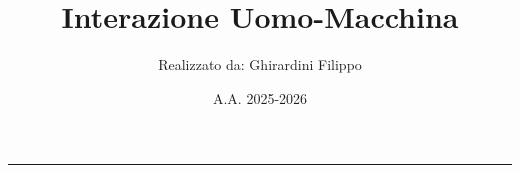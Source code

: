 \documentclass[a4paper,10pt]{article}
\title{\textbf{Interazione Uomo-Macchina}}
\author{Realizzato da: Ghirardini Filippo}
\date{A.A. 2025-2026}
\theoremstyle{remark}
\theoremstyle{definition}
\theoremstyle{plain}
\theoremstyle{definition}
\theoremstyle{definition}
\theoremstyle{definition}
\theoremstyle{plain}
\theoremstyle{plain}
\begin{document}
	
	
	\tableofcontents
	\newpage
	\maketitle
	\begin{center}
		\vspace{-20pt}
		\rule{11cm}{.1pt} 
	\end{center}
	
	
	
	
\end{document}
